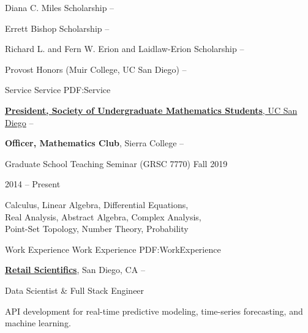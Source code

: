 \documentclass[letterpaper,MMMyyyy,nonstopmode]{simpleresumecv}
\begin{document}
\begin{Body}
\BulletItem
Diana C. Miles Scholarship
\hfill{} -- 

\BulletItem
Errett Bishop Scholarship
\hfill{} -- 

\BulletItem
Richard L. and Fern W. Erion and Laidlaw-Erion Scholarship
\hfill{} -- 

\BulletItem
Provost Honors (Muir College, UC San Diego)
\hfill{} -- 

\Gap


\Section
{Service}
{Service}
{PDF:Service}

\Entry
\href{http://sums.ucsd.edu}
{\textbf{President, Society of Undergraduate Mathematics Students}, UC San Diego}
\hfill{} --

\Gap

\Entry
{\textbf{Officer, Mathematics Club}, Sierra College}
\hfill
{} --



\Gap
{}
\Gap
\BulletItem Graduate School Teaching Seminar (GRSC 7770)
\hfill Fall 2019

\BigGap
{}
\hfill
2014 -- Present
\Gap

\begin{Detail}
\BulletItem Calculus, Linear Algebra, Differential Equations, \\
Real Analysis, Abstract Algebra, Complex Analysis, \\
Point-Set Topology, Number Theory, Probability
\end{Detail}




\Section
{Work Experience}
{Work Experience}
{PDF:WorkExperience}

\Entry
\href{https://www.retailscientifics.com/}
{\textbf{Retail Scientifics}},
San Diego, CA
\hfill
{} --

\Gap
\BulletItem
Data Scientist \& Full Stack Engineer

\begin{Detail}
\SubBulletItem
API development for real-time predictive modeling, time-series forecasting, and machine learning.
\end{Detail}


\end{Body}
\end{document}
